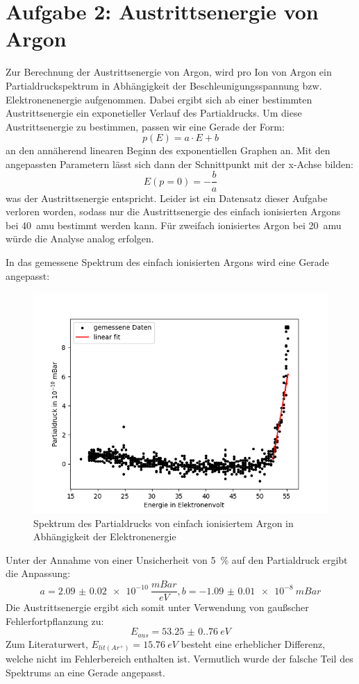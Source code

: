 \section{Aufgabe 2: Austrittsenergie von Argon}

Zur Berechnung der Austrittsenergie von Argon, wird pro Ion von Argon ein Partialdruckspektrum in Abhängigkeit der Beschleunigungsspannung bzw. Elektronenenergie aufgenommen. Dabei ergibt sich ab einer bestimmten Austrittsenergie ein exponetieller Verlauf des Partialdrucks. Um diese Austrittsenergie zu bestimmen, passen wir eine Gerade der Form: $$p(E) = a\cdot E + b$$ an den annäherend linearen Beginn des exponentiellen Graphen an. Mit den angepassten Parametern lässt sich dann der Schnittpunkt mit der x-Achse bilden: $$E(p=0) = -\frac{b}{a}$$ was der Austrittsenergie entspricht. Leider ist ein Datensatz dieser Aufgabe verloren worden, sodass nur die Austrittsenergie des einfach ionisierten Argons bei \SI{40}{amu} bestimmt werden kann. Für zweifach ionisiertes Argon bei \SI{20}{amu} würde die Analyse analog erfolgen. 

In das gemessene Spektrum des einfach ionisierten Argons wird eine Gerade angepasst: 
\begin{figure}[H]
    \centering
    \includegraphics[width=140mm,scale=0.8]{Massenspektrometer/include/MSArgon1Ion.png}
    \caption{Spektrum des Partialdrucks von einfach ionisiertem Argon in Abhängigkeit der Elektronenergie}
    \label{fig:MSArgon1Ion}
\end{figure}
Unter der Annahme von einer Unsicherheit von \SI{5}{\%} auf den Partialdruck ergibt die Anpassung:
$$a = \SI{2.09(2)e-10}{\frac{mBar}{eV}}, b= \SI{-1.09(1)e-8}{mBar}$$
Die Austrittsenergie ergibt sich somit unter Verwendung von gaußscher Fehlerfortpflanzung zu:
$$E_{aus} = \SI{53.25(0.76)}{eV}$$
Zum Literaturwert, $E_{lit(Ar^+)}= \SI{15.76}{eV}$\cite{VorbereitungsMappe} besteht eine erheblicher Differenz, welche nicht im Fehlerbereich enthalten ist. Vermutlich wurde der falsche Teil des Spektrums an eine Gerade angepasst.   

